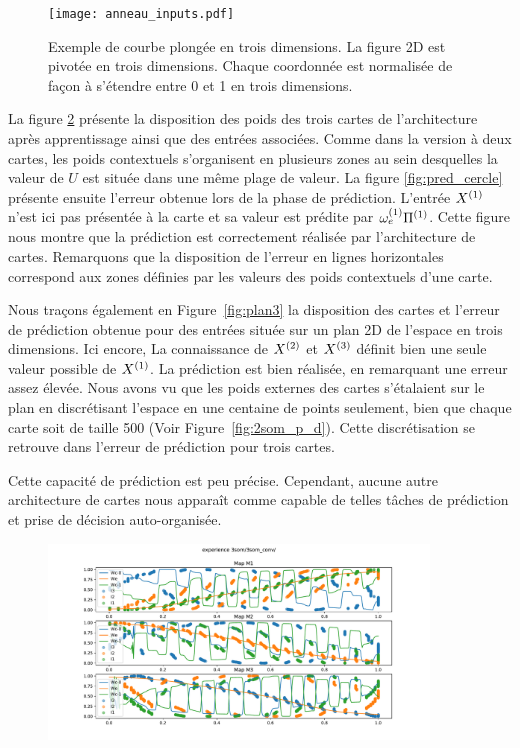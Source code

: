 \documentclass[../main]{subfiles}
\begin{document}
\begin{figure}
	\centering\texttt{[image: anneau\_inputs.pdf]}
	\caption{Exemple de courbe plongée en trois dimensions. La figure 2D est pivotée en trois dimensions. Chaque coordonnée est normalisée de façon à s'étendre entre 0 et 1 en trois dimensions.
	\label{fig:in_3D}}
\end{figure}

La figure \ref{fig:w_cercle} présente la disposition des poids des trois cartes de l'architecture après apprentissage ainsi que des entrées associées. 
Comme dans la version à deux cartes, les poids contextuels s'organisent en plusieurs zones au sein desquelles la valeur de $U$ est située dans une même plage de valeur. 
La figure \ref{fig:pred_cercle} présente ensuite l'erreur obtenue lors de la phase de prédiction. L'entrée $X^{({1})}$ n'est ici pas présentée à la carte et sa valeur est prédite par $\omega_{e}^{({1})}{\Pi^{({1})}}$. 
Cette figure nous montre que la prédiction est correctement réalisée par l'architecture de cartes. Remarquons que la disposition de l'erreur en lignes horizontales correspond aux zones définies par les valeurs des poids contextuels d'une carte.

Nous traçons également en Figure~\ref{fig:plan3} la disposition des cartes et l'erreur de prédiction obtenue pour des entrées située sur un plan 2D de l'espace en trois dimensions. Ici encore, La connaissance de $X^{({2})}$ et $X^{({3})}$ définit bien une seule valeur possible de $X^{({1})}$. La prédiction est bien réalisée, en remarquant une erreur assez élevée. Nous avons vu que les poids externes des cartes s'étalaient sur le plan en discrétisant l'espace en une centaine de points seulement, bien que chaque carte soit de taille 500 (Voir Figure~\ref{fig:2som_p_d}). Cette discrétisation se retrouve dans l'erreur de prédiction pour trois cartes.

Cette capacité de prédiction est peu précise. Cependant, aucune autre architecture de cartes nous apparaît comme capable de telles tâches de prédiction et prise de décision auto-organisée.


\begin{figure}
	\centering\includegraphics[width=0.9\textwidth]{3som_cercle_w.pdf}
	\caption{\label{fig:w_cercle}}
\end{figure}
\end{document}
